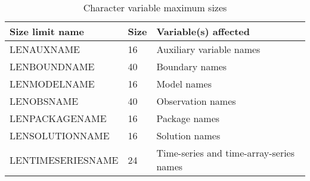 \begin{table}[H]
\caption{Character variable maximum sizes}
\small
\begin{center}
\begin{tabular*}{\columnwidth}{l l l}
\hline
\hline
\textbf{Size limit name} & \textbf{Size} & \textbf{Variable(s) affected} \\
\hline
LENAUXNAME & 16 & Auxiliary variable names \\
LENBOUNDNAME & 40 & Boundary names \\
LENMODELNAME & 16 & Model names \\
LENOBSNAME & 40 & Observation names \\
LENPACKAGENAME & 16 & Package names \\
LENSOLUTIONNAME & 16 & Solution names \\
LENTIMESERIESNAME & 24 & Time-series and time-array-series names \\
\hline
\end{tabular*}
\label{table:characterlength}
\end{center}
\normalsize
\end{table}
